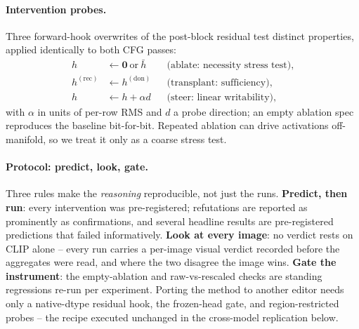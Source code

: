 \paragraph{Intervention probes.}
Three forward-hook overwrites of the post-block residual test distinct
properties, applied identically to both CFG passes:
\begin{align}
  h &\leftarrow \mathbf{0}\ \text{or}\ \bar{h}
  && \text{(ablate: necessity stress test)}, \nonumber \\
  h^{(\mathrm{rec})} &\leftarrow h^{(\mathrm{don})}
  && \text{(transplant: sufficiency)}, \nonumber \\
  h &\leftarrow h + \alpha d
  && \text{(steer: linear writability)},
  \label{eq:interventions}
\end{align}
with $\alpha$ in units of per-row RMS and $d$ a probe direction; an empty
ablation spec reproduces the baseline bit-for-bit. Repeated ablation can
drive activations off-manifold, so we treat it only as a coarse stress test.

\paragraph{Protocol: predict, look, gate.} Three rules make the
\emph{reasoning} reproducible, not just the runs. \textbf{Predict, then
run}: every intervention was pre-registered; refutations are reported as
prominently as confirmations, and several headline results are
pre-registered predictions that failed informatively. \textbf{Look at
every image}: no verdict rests on CLIP alone -- every run carries a
per-image visual verdict recorded before the aggregates were read, and
where the two disagree the image wins. \textbf{Gate the instrument}: the
empty-ablation and raw-vs-rescaled checks are standing regressions re-run
per experiment. Porting the method to another editor needs only a
native-dtype residual hook, the frozen-head gate, and region-restricted
probes -- the recipe executed unchanged in the cross-model replication
below.
